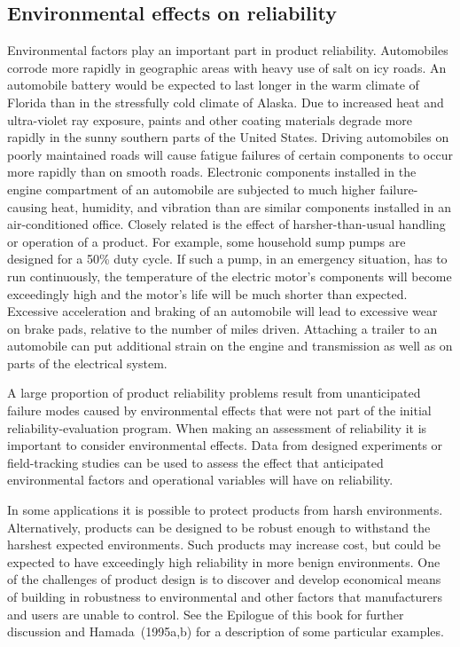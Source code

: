 \subsection{Environmental effects on reliability} 
\label{section:effect.of.environment}
Environmental factors play an important part in product reliability.
Automobiles corrode more rapidly in geographic areas with heavy use of
salt on icy roads.  An automobile battery would be expected to last
longer in the warm climate of Florida than in the stressfully cold
climate of Alaska. Due to increased heat and ultra-violet ray
exposure, paints and other coating materials degrade more rapidly in
the sunny southern parts of the United States.  Driving automobiles on
poorly maintained roads will cause fatigue failures of certain
components to occur more rapidly than on smooth roads.  Electronic
components installed in the engine compartment of an automobile are
subjected to much higher failure-causing heat, humidity, and vibration
than are similar components installed in an air-conditioned office.
Closely related is the effect of harsher-than-usual handling or
operation of a product.  For example, some household sump pumps are
designed for a 50\% duty cycle.  If such a pump, in an emergency
situation, has to run continuously, the temperature of the electric
motor's components will become exceedingly high and the motor's life
will be much shorter than expected.  Excessive acceleration and
braking of an automobile will lead to excessive wear on brake pads,
relative to the number of miles driven. Attaching a trailer to an
automobile can put additional strain on the engine and transmission as
well as on parts of the electrical system.

A large proportion of product reliability problems result from
unanticipated failure modes caused by environmental effects that were
not part of the initial reliability-evaluation program. When making an
assessment of reliability it is important to consider environmental
effects.  Data from designed experiments or field-tracking studies can
be used to assess the effect that anticipated environmental factors
and operational variables will have on reliability.

In some applications it is possible to protect products from harsh
environments. Alternatively, products can be designed to be robust
enough to withstand the harshest expected environments. Such products
may increase cost, but could be expected to have exceedingly high
reliability in more benign environments.  One of the challenges of
product design is to discover and develop economical means of building
in robustness to environmental and other factors that manufacturers
and users are unable to control. See the Epilogue of this
book for further discussion and Hamada~(1995a,b) for a description of
some particular examples.


